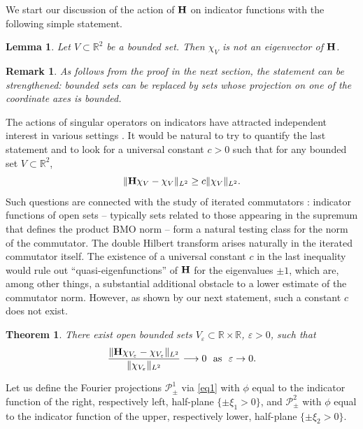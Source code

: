\documentclass{article}
\newtheorem{theorem}{Theorem}
\newtheorem{lemma}{Lemma}
\newtheorem{remark}{Remark}
\def\H{{\bf H}}
\def\R{{\mathbb R}}
\begin{document}
	We start our discussion of the action of $\H$ on indicator functions with the following simple statement.

	\begin{lemma}\label{L1}
		Let $V\subset \R^2$ be a bounded set. Then $\chi_V$ is not an eigenvector of $\H$.
	\end{lemma}

	\begin{remark}
		As follows from the proof in the next section, the statement can be strengthened: bounded sets can be replaced by sets whose
		projection on one of the coordinate axes is bounded.
	\end{remark}

The actions of singular operators on indicators have attracted independent interest in various settings \cite{Va, So, Ha}. 
	It would be natural to try to quantify the last statement and to look for a universal constant $c>0$ such that for any bounded set $V\subset \R^2$,
	$$\| \H \chi_V -
	\chi_V \|_{L^2}\geq c\|\chi_V \|_{L^2}.$$
	Such questions are connected with the study of iterated commutators \cite{Ho, Vo}: indicator functions of open sets -- typically sets related to those appearing in the supremum that defines the product BMO norm -- form a natural testing class for the norm of the commutator. The double Hilbert transform arises naturally in the iterated commutator itself. The existence of a universal constant $c$ in the last inequality would rule out ``quasi-eigenfunctions'' of $\H$ for the eigenvalues $\pm 1$, which are, among other things, a substantial additional obstacle to a lower estimate of the commutator norm. However, as shown by our next statement, such a constant
$c$ does not exist.

	\begin{theorem}\label{T1}
		There exist open bounded sets $V_{\varepsilon} \subset \mathbb{R}
		\times \mathbb{R}$, $\varepsilon>0$, such that
		\begin{equation}
			\frac{\| \H \chi_{V_{\varepsilon}} -
				\chi_{V_{\varepsilon}} \|_{L^2}}{\| \chi_{V_{\varepsilon}} \|_{L^2}}
			\longrightarrow 0 \ \text{ as } \ \varepsilon \rightarrow 0. \label{asymcts}
		\end{equation}
	\end{theorem}

	Let us define the Fourier projections $\mathcal{P}^1_{\pm}$ via \eqref{eq1} with
	$\phi$ equal to the indicator function of the right, respectively left, half-plane $\{\pm\xi_1>0\}$, and $\mathcal{P}^2_{\pm}$ with $\phi$ equal to the indicator function of the upper, respectively lower, half-plane $\{\pm\xi_2>0\}$.
\end{document}
